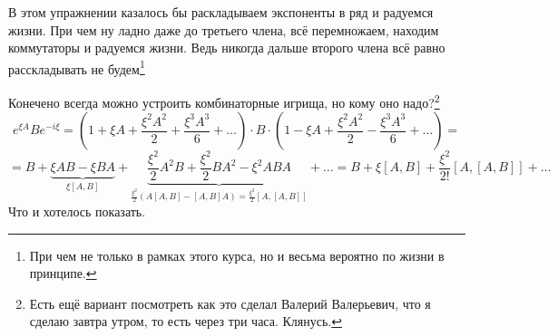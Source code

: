 В этом упражнении казалось бы раскладываем экспоненты в ряд и радуемся жизни. При чем ну ладно даже до третьего члена, всё перемножаем, находим коммутаторы и радуемся жизни. Ведь никогда дальше второго члена всё равно расскладывать не будем\footnote{При чем не только в рамках этого курса, но и весьма вероятно по жизни в принципе.} 

Конечено всегда можно устроить комбинаторные игрища, но кому оно надо?\footnote{Есть ещё вариант посмотреть как это сделал Валерий Валерьевич, что я сделаю завтра утром, то есть через три часа. Клянусь.}
\begin{equation*}
	e^{\xi A} B e^{- i \xi} = \left(1 + \xi A + \frac{\xi^2 A^2}{2} + \frac{\xi^3 A^3}{6} + \ldots\right) \cdot B \cdot \left(1 - \xi A + \frac{\xi^2 A^2}{2} - \frac{\xi^3 A^3}{6} + \ldots\right)
	=
\end{equation*} 
\begin{equation*}
	= B + \underbrace{\xi A B - \xi B A}_{\xi[A,B]} + \underbrace{\frac{\xi^2}{2}  A^2 B + \frac{\xi^2}{2} B A^2 - \xi^2 A B A}_{\frac{\xi^2}{2} (A [A,B] - [A,B] A) = \frac{\xi^2}{2}[A, [A,B]]} + \ldots
	=
	B + \xi[A,B] + \frac{\xi^2}{2!}[A, [A,B]] + \ldots
\end{equation*}
Что и хотелось показать.